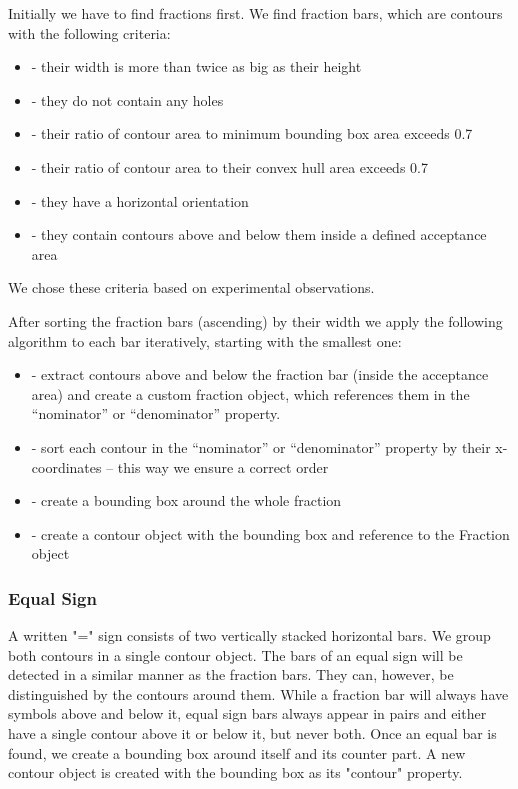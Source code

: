 \documentclass[12pt]{article}
\begin{document}
	Initially we have to find fractions first. We find fraction bars, which are contours with the following criteria:
	\begin{itemize}
		\item - their width is more than twice as big as their height
		\item - they do not contain any holes
		\item - their ratio of contour area to minimum bounding box area exceeds 0.7
		\item - their ratio of contour area to their convex hull area exceeds 0.7
		\item - they have a horizontal orientation
		\item - they contain contours above and below them inside a defined acceptance area
	\end{itemize}

	We chose these criteria based on experimental observations.

	After sorting the fraction bars (ascending) by their width we apply the following algorithm to each bar iteratively, starting with the smallest one:
	\begin{itemize}
		\item - extract contours above and below the fraction bar (inside the acceptance area) and create a custom fraction object, which references them in the “nominator” or “denominator” property.
		\item - sort each contour in the “nominator” or “denominator” property by their x-coordinates – this way we ensure a correct order
		\item - create a bounding box around the whole fraction
		\item - create a contour object with the bounding box and reference to the Fraction object
	\end{itemize}

	\subsubsection{Equal Sign}
	A written "=" sign consists of two vertically stacked horizontal bars. We group both contours in a single contour object.
	The bars of an equal sign will be detected in a similar manner as the fraction bars.
	They can, however, be distinguished by the contours around them.
	While a fraction bar will always have symbols above and below it, equal sign bars always appear in pairs
	and either have a single contour above it or below it, but never both.
	Once an equal bar is found, we create a bounding box around itself and its counter part.
	A new contour object is created with the bounding box as its "contour" property.
\end{document}
